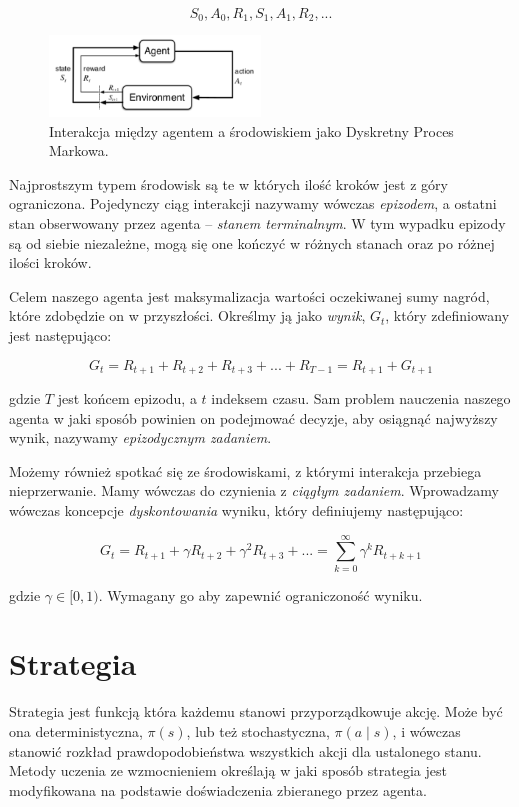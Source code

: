 \documentclass[licencjacka]{pracamgr}
\begin{document}
$$ S_0, A_0, R_1, S_1, A_1, R_2, ... $$


\begin{figure}[ht]
  \centering
  \includegraphics[width=0.5\textwidth]{agent_env_interaction}
  \caption{Interakcja między agentem a środowiskiem jako Dyskretny Proces Markowa. \cite{Sutton}}
\end{figure}

Najprostszym typem środowisk są te w których ilość kroków jest z góry ograniczona. Pojedynczy ciąg interakcji nazywamy wówczas \emph{epizodem}, a ostatni stan obserwowany przez agenta -- \emph{stanem terminalnym}. W tym wypadku epizody są od siebie niezależne, mogą się one kończyć w różnych stanach oraz po różnej ilości kroków. 

Celem naszego agenta jest maksymalizacja wartości oczekiwanej sumy nagród, które zdobędzie on w przyszłości. Określmy ją jako \emph{wynik}, $ G_t $, który zdefiniowany jest następująco:

$$ G_t = R_{t+1} + R_{t+2} + R_{t+3} + ... + R_{T-1} = R_{t+1} + G_{t+1} $$

gdzie $T$ jest końcem epizodu, a $t$ indeksem czasu. Sam problem nauczenia naszego agenta w jaki sposób powinien on podejmować decyzje, aby osiągnąć najwyższy wynik, nazywamy \emph{epizodycznym zadaniem}.

Możemy również spotkać się ze środowiskami, z którymi interakcja przebiega nieprzerwanie. Mamy wówczas do czynienia z \emph{ciągłym zadaniem}. Wprowadzamy wówczas koncepcje \emph{dyskontowania} wyniku, który definiujemy następująco:

$$ G_t = R_{t+1} + \gamma R_{t+2} + \gamma^2 R_{t+3} + ... = 
\sum_{k=0}^{\infty} \gamma^k R_{t+k+1} $$

gdzie $ \gamma \in [0, 1) $. Wymagany go aby zapewnić ograniczoność wyniku.


\section{Strategia}

Strategia jest funkcją która każdemu stanowi przyporządkowuje akcję. Może być ona deterministyczna, $ \pi(s) $, lub też stochastyczna, $ \pi(a \mid s) $, i wówczas stanowić rozkład prawdopodobieństwa wszystkich akcji dla ustalonego stanu. Metody uczenia ze wzmocnieniem określają w jaki sposób strategia jest modyfikowana na podstawie doświadczenia zbieranego przez agenta.
\end{document}
